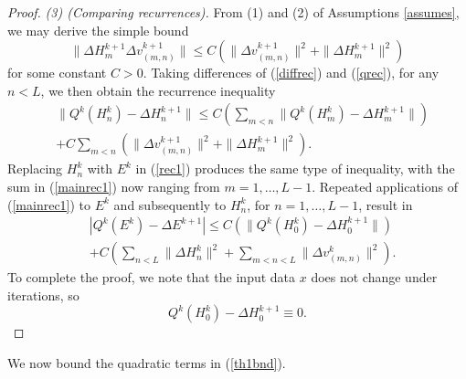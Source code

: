 \documentclass{jcmlatex}
\begin{document}
\begin{proof}
\textit{(3) (Comparing recurrences).}
From (1) and (2) of Assumptions \ref{assumes}, we may derive the simple bound
\begin{equation}
\|\Delta H_m^{k+1}\Delta v_{(m,n)}^{k+1}\| \le C( \|\Delta v_{(m,n)}^{k+1}\|^2+\|\Delta
H_m^{k+1}\|^2)
\end{equation}
for some constant $C>0$.
Taking differences of (\ref{diffrec}) and (\ref{qrec}),
for any $n<L$,  we then obtain the recurrence inequality
\begin{align}
&\|Q^k(H_n^{k})-\Delta H_n^{k+1} \|\le C\left(\sum_{m < n}\|Q^k(
H_m^{k})-\Delta H_m^{k+1} \|  \right)  \label{rec1}\\&+ C\sum_{m<n} ( \|\Delta v_{(m,n)}^{k+1}\|^2+\|\Delta
H_m^{k+1}\|^2) \label{mainrec1}.
\end{align}
Replacing $H_n^k$ with $E^k$ in (\ref{rec1}) produces the same type of inequality,
with the sum in (\ref{mainrec1}) now ranging from $m = 1, \dots, L-1$. Repeated
applications of (\ref{mainrec1}) to  $E^k$ and subsequently to $H_n^k$,
for $n = 1, \dots, L-1$, result in
\begin{align}
&|Q^k(E^k)-\Delta E^{k+1}|\le C\left(\|Q^k( H_0^{k})-\Delta H_0^{k+1} \|  \right)
\\&+ C\left(\sum_{n< L}\|\Delta H_n^k\|^2 + \sum_{m<n< L}\|\Delta v_{(m,n)}^k\|^2\right)
\label{mainrec}.
\end{align}
To complete the proof, we note that
 the input data $x$ does not change under iterations, so \begin{equation}
Q^k( H_0^{k})-\Delta H_0^{k+1} \equiv 0.
\end{equation}
\end{proof} We now bound the quadratic terms in (\ref{th1bnd}).
\end{document}
